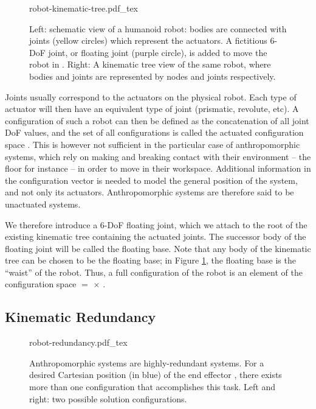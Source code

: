 \begin{figure}
  \centering
      {\def\svgwidth{0.8\linewidth}
        
                   {robot-kinematic-tree.pdf_tex}}
      \caption{Left: schematic view of a humanoid robot: bodies
        are connected with joints (yellow circles) which represent the
        actuators. A fictitious 6-DoF joint, or floating joint (purple
        circle), is added to move the robot in \segroup. Right: A
        kinematic tree view of the same robot, where bodies and joints
        are represented by nodes and joints respectively.}
      \label{fig:chap1-robot-kinematic-tree}
\end{figure}

Joints usually correspond to the actuators on the physical robot. Each
type of actuator will then have an equivalent type of joint
(prismatic, revolute, etc). A configuration \config{} of such a robot
can then be defined as the concatenation of all joint DoF values, and
the set of all configurations is called the actuated configuration
space \actcspace. This is however not sufficient in the particular
case of anthropomorphic systems, which rely on making and breaking
contact with their environment -- the floor for instance -- in order
to move in their workspace. Additional information in the
configuration vector is needed to model the general position of the
system, and not only its actuators. Anthropomorphic systems are
therefore said to be unactuated systems.

We therefore introduce a 6-DoF floating joint, which we attach to the
root of the existing kinematic tree containing the actuated
joints. The successor body of the floating joint will be called the
floating base. Note that any body of the kinematic tree can be chosen
to be the floating base; in Figure
\ref{fig:chap1-robot-kinematic-tree}, the floating base is the
``waist'' of the robot. Thus, a full configuration \config{} of the
robot \robot is an element of the configuration space \cspace $=$
\segroup $\times$ \actcspace.
 
\subsection{Kinematic Redundancy}
\label{subsec:chap1-kinematic-redundancy}

\begin{figure}
  \centering
      {\def\svgwidth{0.8\linewidth}
        
                   {robot-redundancy.pdf_tex}}
      \caption{Anthropomorphic systems are highly-redundant
        systems. For a desired Cartesian position (in blue) of the end
        effector , there exists more than one configuration
        \config{} that accomplishes this task. Left and right: two
        possible solution configurations.}
      \label{fig:chap1-robot-redundancy}
\end{figure}

